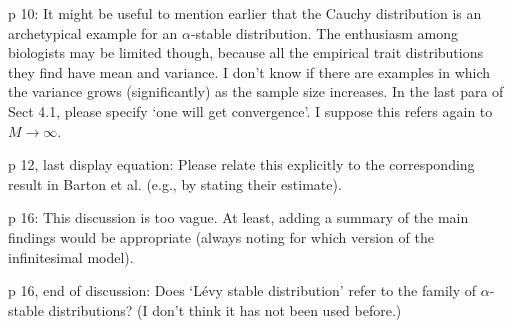 \reply{
}

\begin{point}{}
p 10: It might be useful to mention earlier that the Cauchy distribution is an archetypical
example for an $\alpha$-stable distribution. The enthusiasm among biologists may be limited
though, because all the empirical trait distributions they find have mean and variance. I
don’t know if there are examples in which the variance grows (significantly) as the sample
size increases. In the last para of Sect 4.1, please specify ‘one will get convergence’. I
suppose this refers again to $M \to \infty$.
\end{point}

\reply{
}

\begin{point}{}
p 12, last display equation: Please relate this explicitly to the corresponding result in
Barton et al. (e.g., by stating their estimate).
\end{point}

\reply{
}

\begin{point}{}
p 16: This discussion is too vague. At least, adding a summary of the main findings
would be appropriate (always noting for which version of the infinitesimal model).
\end{point}

\reply{
}

\begin{point}{}
p 16, end of discussion: Does ‘Lévy stable distribution’ refer to the family of $\alpha$-stable
distributions? (I don’t think it has not been used before.)
\end{point}

\reply{
}
